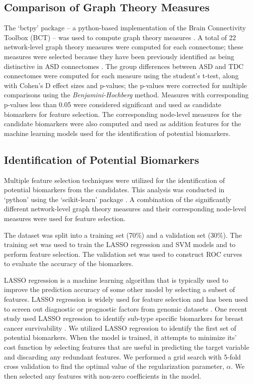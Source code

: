 \documentclass[11pt,conference]{IEEEtran}
\begin{document}
\subsection*{\textbf{Comparison of Graph Theory Measures}}
    The `bctpy' package -- a python-based implementation of the Brain Connectivity 
    Toolbox (BCT) -- was used to compute graph theory measures \cite{Rubinov.2010.BCT}.
    A total of 22 network-level graph theory measures were computed for each connectome; 
    these measures were selected because they have been previously identified as being
    distinctive in ASD connectomes \cite{Roine.2015,Craddock.2013}.
    The group differences between ASD and TDC connectomes were computed for each measure 
    using the student's t-test, along with Cohen's D effect sizes and p-values; the 
    p-values were corrected for multiple comparisons using the \textit{Benjamini-Hochberg} 
    method. Measures with corresponding p-values less than 0.05 were considered significant 
    and used as candidate biomarkers for feature selection. The corresponding node-level 
    measures for the candidate biomarkers were also computed and used as addition features 
    for the machine learning models used for the identification of potential biomarkers.

\subsection*{\textbf{Identification of Potential Biomarkers}}
    Multiple feature selection techniques were utilized for the identification of 
    potential biomarkers from the candidates. This analysis was conducted in `python' 
    using the `scikit-learn' package \cite{sklearn}. A combination of the significantly 
    different network-level graph theory measures and their corresponding node-level 
    measures were used for feature selection.

    The dataset was split into a training set (70\%) and a validation set (30\%). The 
    training set was used to train the LASSO regression and SVM models and to perform 
    feature selection. The validation set was used to construct ROC curves to evaluate 
    the accuracy of the biomarkers.

    LASSO regression is a machine learning algorithm that is typically used to improve 
    the prediction accuracy of some other model by selecting a subset of features.
    LASSO regression is widely used for feature selection and has been used to screen out 
    diagnostic or prognostic factors from genomic datasets \cite{Wang.2019}. One recent 
    study used LASSO regression to identify sub-type specific biomarkers for breast 
    cancer survivability \cite{Jubair.2020}. We utilized LASSO regression to identify the 
    first set of potential biomarkers. When the model is trained, it attempts to minimize 
    its' cost function by selecting features that are useful in predicting the target 
    variable and discarding any redundant features. We performed a grid search with 5-fold 
    cross validation to find the optimal value of the regularization parameter, $\alpha$. 
    We then selected any features with non-zero coefficients in the model.
\end{document}
